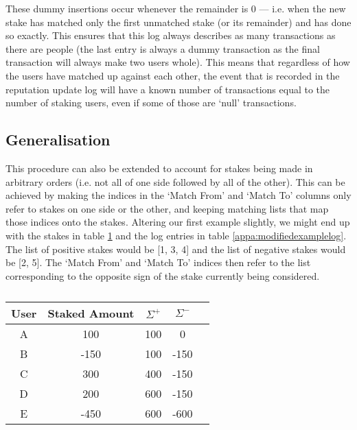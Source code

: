 These dummy insertions occur whenever the remainder is 0 --- i.e. when the new stake has matched only the first unmatched stake (or its remainder) and has done so exactly. This ensures that this log always describes as many transactions as there are people (the last entry is always a dummy transaction as the final transaction will always make two users whole). This means that regardless of how the users have matched up against each other, the event that is recorded in the reputation update log will have a known number of transactions equal to the number of staking users, even if some of those are `null' transactions.

\subsection{Generalisation}

This procedure can also be extended to account for stakes being made in arbitrary orders (i.e. not all of one side followed by all of the other). This can be achieved by making the indices in the `Match From' and `Match To' columns only refer to stakes on one side or the other, and keeping matching lists that map those indices onto the stakes. Altering our first example slightly, we might end up with the stakes in table \ref{appa:modifiedexample} and the log entries in table \ref{appa:modifiedexamplelog}. The list of positive stakes would be [1, 3, 4] and the list of negative stakes would be [2, 5]. The `Match From' and `Match To' indices then refer to the list corresponding to the opposite sign of the stake currently being considered.

\begin{table}[ht]
\centering
\caption{}
\label{appa:modifiedexample}
\begin{tabular}{|c|c|c|c|c|}
\hline
User  & Staked Amount & $\Sigma^+$ & $\Sigma^-$ \\ \hline
A & 100           & 100                      & 0                                                                       \\ \hline
B & -150           & 100                      & -150                                                                     \\ \hline
C & 300           & 400                      & -150                                                                       \\ \hline
D & 200          & 600                      & -150                                                                    \\ \hline
E & -450          & 600                      & -600                                                                    \\ \hline
\end{tabular}
\end{table}

